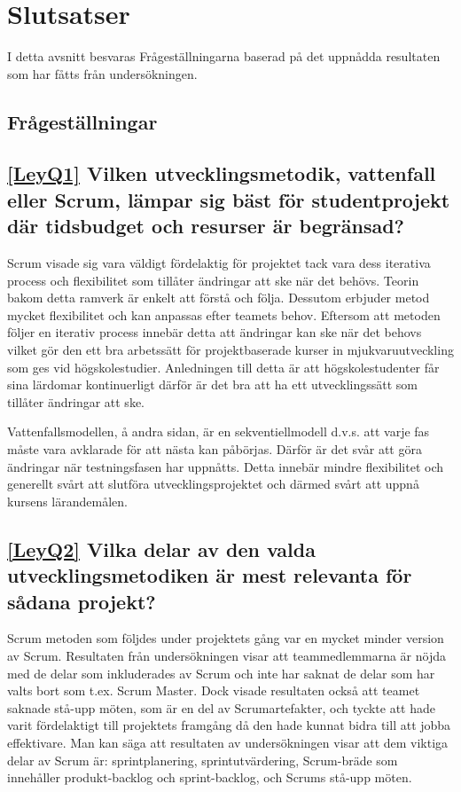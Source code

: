 \section{Slutsatser}
\label{sec:Lieth_Wahid-conclusion}
I detta avsnitt besvaras Frågeställningarna baserad på det uppnådda resultaten som har fåtts från undersökningen.
\subsection{Frågeställningar}

\subsection*{\ref{LeyQ1} Vilken utvecklingsmetodik, vattenfall eller Scrum, lämpar sig bäst för studentprojekt där tidsbudget och resurser är begränsad?}
Scrum visade sig vara väldigt fördelaktig för projektet tack vara dess iterativa process och flexibilitet som tillåter ändringar att ske när det behövs. Teorin bakom detta ramverk är enkelt att förstå och följa. Dessutom erbjuder metod mycket flexibilitet och kan anpassas efter teamets behov. Eftersom att metoden följer en iterativ process innebär detta att ändringar kan ske när det behovs vilket gör den ett bra arbetssätt för projektbaserade kurser in mjukvaruutveckling som ges vid högskolestudier. Anledningen till detta är att högskolestudenter får sina lärdomar kontinuerligt därför är det bra att ha ett utvecklingssätt som tillåter ändringar att ske.
	
Vattenfallsmodellen, å andra sidan, är en sekventiellmodell d.v.s. att varje fas måste vara avklarade för att nästa kan påbörjas. Därför är det svår att göra ändringar när testningsfasen har uppnåtts. Detta innebär mindre flexibilitet och generellt svårt att slutföra utvecklingsprojektet och därmed svårt att uppnå kursens lärandemålen.
		
\subsection*{\ref{LeyQ2} Vilka delar av den valda utvecklingsmetodiken är mest relevanta för sådana projekt? }
Scrum metoden som följdes under projektets gång var en mycket minder version av Scrum. Resultaten från undersökningen visar att teammedlemmarna är nöjda med de delar som inkluderades av Scrum och inte har saknat de delar som har valts bort som t.ex. Scrum Master. Dock visade resultaten också att teamet saknade stå-upp möten, som är en del av Scrumartefakter, och tyckte att hade varit fördelaktigt till projektets framgång då den hade kunnat bidra till att jobba effektivare. Man kan säga att resultaten av undersökningen visar att dem viktiga delar av Scrum är: sprintplanering, sprintutvärdering, Scrum-bräde som innehåller produkt-backlog och sprint-backlog, och Scrums stå-upp möten.